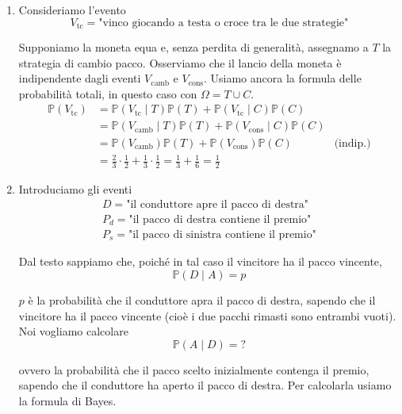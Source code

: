 \begin{enumerate}
\item Consideriamo l'evento\begin{equation*}
V_{\text{tc}} =\text{"vinco giocando a testa o croce tra le due strategie"}
\end{equation*}

Supponiamo la moneta equa e, senza perdita di generalità, assegnamo a $T$ la strategia di cambio pacco. Osserviamo che il lancio della moneta è indipendente dagli eventi $V_{\text{camb}}$ e $V_{\text{cons}}$. Usiamo ancora la formula delle probabilità totali, in questo caso con $\Omega =T\cup C$.\begin{equation*}
\begin{aligned}
\mathbb{P}( V_{\text{tc}}) & =\mathbb{P}( V_{\text{tc}} \mid T)\mathbb{P}( T) +\mathbb{P}( V_{\text{tc}} \mid C)\mathbb{P}( C) & \\
 & =\mathbb{P}( V_{\text{camb}} \mid T)\mathbb{P}( T) +\mathbb{P}( V_{\text{cons}} \mid C)\mathbb{P}( C) & \\
 & =\mathbb{P}( V_{\text{camb}})\mathbb{P}( T) +\mathbb{P}( V_{\text{cons}})\mathbb{P}( C) & \text{(indip.)}\\
 & =\frac{2}{3} \cdotp \frac{1}{2} +\frac{1}{3} \cdotp \frac{1}{2} =\frac{1}{3} +\frac{1}{6} =\frac{1}{2} & 
\end{aligned}
\end{equation*}
\item Introduciamo gli eventi\begin{gather*}
D=\text{"il conduttore apre il pacco di destra"}\\
P_{d} =\text{"il pacco di destra contiene il premio"}\\
P_{s} =\text{"il pacco di sinistra contiene il premio"}
\end{gather*}

Dal testo sappiamo che, poiché in tal caso il vincitore ha il pacco vincente,\begin{equation*}
\boxed{\mathbb{P}( D\mid A) =p}
\end{equation*}

$p$ è la probabilità che il conduttore apra il pacco di destra, sapendo che il vincitore ha il pacco vincente (cioè i due pacchi rimasti sono entrambi vuoti). Noi vogliamo calcolare\begin{equation*}
\boxed{\mathbb{P}( A\mid D) =?}
\end{equation*}

ovvero la probabilità che il pacco scelto inizialmente contenga il premio, sapendo che il conduttore ha aperto il pacco di destra. Per calcolarla usiamo la formula di Bayes.


\end{enumerate}
